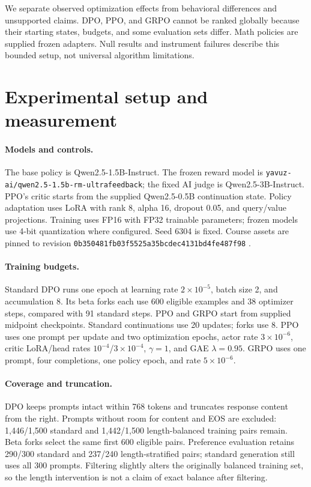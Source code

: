 \documentclass{article}
\begin{document}
We separate observed optimization effects from behavioral differences and unsupported claims. DPO, PPO, and GRPO cannot be ranked globally because their starting states, budgets, and some evaluation sets differ. Math policies are supplied frozen adapters. Null results and instrument failures describe this bounded setup, not universal algorithm limitations.
\clearpage

\section{Experimental setup and measurement}
\paragraph{Models and controls.} The base policy is Qwen2.5-1.5B-Instruct. The frozen reward model is \texttt{yavuz-ai/qwen2.5-1.5b-rm-ultrafeedback}; the fixed AI judge is Qwen2.5-3B-Instruct. PPO's critic starts from the supplied Qwen2.5-0.5B continuation state. Policy adaptation uses LoRA \cite{lora} with rank 8, alpha 16, dropout 0.05, and query/value projections. Training uses FP16 with FP32 trainable parameters; frozen models use 4-bit quantization where configured. Seed 6304 is fixed. Course assets are pinned to revision \texttt{0b350481fb03f5525a35bcdec4131bd4fe487f98} \cite{assets}.

\paragraph{Training budgets.} Standard DPO runs one epoch at learning rate $2\times10^{-5}$, batch size 2, and accumulation 8. Its beta forks each use 600 eligible examples and 38 optimizer steps, compared with 91 standard steps. PPO and GRPO start from supplied midpoint checkpoints. Standard continuations use 20 updates; forks use 8. PPO uses one prompt per update and two optimization epochs, actor rate $3\times10^{-6}$, critic LoRA/head rates $10^{-4}$/$3\times10^{-4}$, $\gamma=1$, and GAE $\lambda=0.95$. GRPO uses one prompt, four completions, one policy epoch, and rate $5\times10^{-6}$.

\paragraph{Coverage and truncation.} DPO keeps prompts intact within 768 tokens and truncates response content from the right. Prompts without room for content and EOS are excluded: 1,446/1,500 standard and 1,442/1,500 length-balanced training pairs remain. Beta forks select the same first 600 eligible pairs. Preference evaluation retains 290/300 standard and 237/240 length-stratified pairs; standard generation still uses all 300 prompts. Filtering slightly alters the originally balanced training set, so the length intervention is not a claim of exact balance after filtering.
\end{document}
